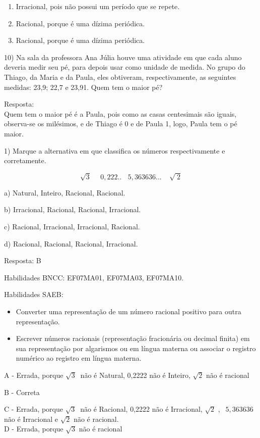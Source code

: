 {\begin{enumerate}
\def\labelenumi{\alph{enumi})}
\item
  Irracional, pois não possui um período que se repete.
\item
  Racional, porque é uma dízima periódica.
\item
  Racional, porque é uma dízima periódica.
\end{enumerate}

10) Na sala da professora Ana Júlia houve uma atividade em que cada
aluno deveria medir seu pé, para depois usar como unidade de medida. No
grupo do Thiago, da Maria e da Paula, eles obtiveram, respectivamente,
as seguintes medidas: 23,9; 22,7 e 23,91. Quem tem o maior pé?

Resposta:\\
Quem tem o maior pé é a Paula, pois como as casas centesimais são
iguais, observa-se os milésimos, e de Thiago é 0 e de Paula 1, logo,
Paula tem o pé maior.


1) Marque a alternativa em que classifica os números respectivamente e
corretamente.

\[\sqrt{3}\ \ \ \ \ \ 0,222..\ \ \ \ 5,363636...\ \ \ \ \ \sqrt{\ 2}\]

a) Natural, Inteiro, Racional, Racional.

b) Irracional, Racional, Racional, Irracional.

c) Racional, Irracional, Irracional, Racional.

d) Racional, Racional, Racional, Irracional.

Resposta: B

Habilidades BNCC: EF07MA01, EF07MA03, EF07MA10.

Habilidades SAEB:

\begin{itemize}
\item
  Converter uma representação de um número racional positivo para outra
  representação.
\item
  Escrever números racionais (representação fracionária ou decimal
  finita) em sua representação por algarismos ou em língua materna ou
  associar o registro numérico ao registro em língua materna.
\end{itemize}

A - Errada, porque \(\sqrt{3}\ \) não é Natural, 0,2222 não é Inteiro,
\(\sqrt{2}\) não é racional

B - Correta

C - Errada, porque \(\sqrt{3}\ \) não é Racional, 0,2222 não é
Irracional, \(\sqrt{2}\) , \(\ \ 5,363636\)não é Irracional e
\(\sqrt{2}\) não é racional.\\
D - Errada, porque \(\sqrt{3}\) não é racional

}
